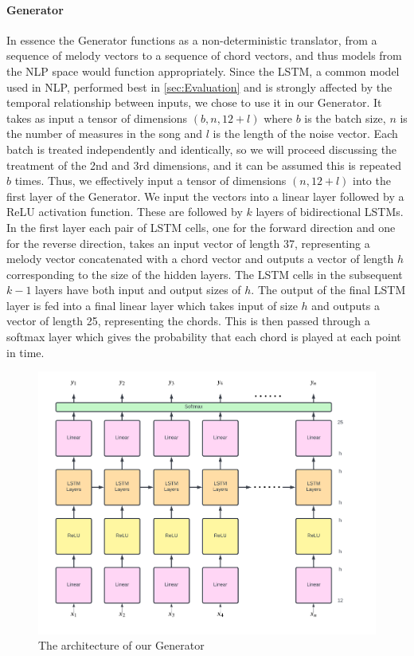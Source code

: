 \paragraph{Generator}
In essence the Generator functions as a non-deterministic translator, from a sequence of melody vectors to a sequence of chord vectors, and thus models from the NLP space would function appropriately.
Since the LSTM, a common model used in NLP, performed best in \cref{sec:Evaluation} and is strongly affected by the temporal relationship between inputs, we chose to use it in our Generator.
It takes as input a tensor of dimensions $(b,n,12+l)$ where $b$ is the batch size, $n$ is the number of measures in the song and $l$ is the length of the noise vector.
Each batch is treated independently and identically, so we will proceed discussing the treatment of the 2nd and 3rd dimensions, and it can be assumed this is repeated $b$ times.
Thus, we effectively input a tensor of dimensions $(n,12+l)$ into the first layer of the Generator.
We input the vectors into a linear layer followed by a ReLU activation function. 
These are followed by $k$ layers of bidirectional LSTMs.
In the first layer each pair of LSTM cells, one for the forward direction and one for the reverse direction, takes an input vector of length 37, representing a melody vector concatenated with a chord vector and outputs a vector of length $h$ corresponding to the size of the hidden layers.
The LSTM cells in the subsequent $k-1$ layers have both input and output sizes of $h$.
The output of the final LSTM layer is fed into a final linear layer which takes input of size $h$ and outputs a vector of length 25, representing the chords.
This is then passed through a softmax layer which gives the probability that each chord is played at each point in time.

\begin{figure}
    \centering
    \includegraphics[width=0.8\columnwidth]{Figures/Generator}
    \decoRule
    \caption{The architecture of our Generator}
    \label{fig:Generator}
\end{figure}

